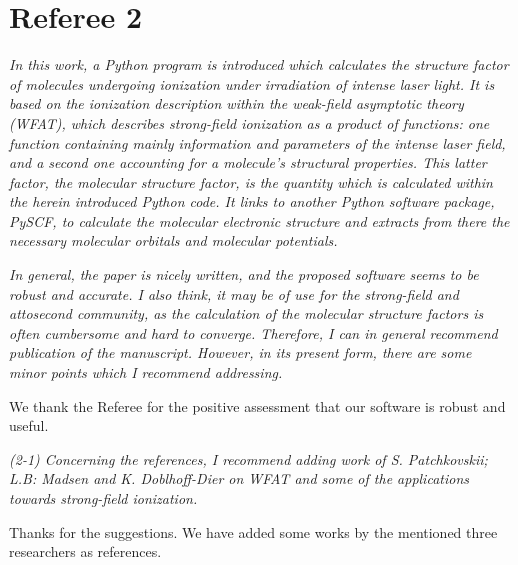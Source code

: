 \documentclass[a4paper,11pt]{article}
\begin{document}
\vspace{2em}



\section*{Referee 2}

\textit{
In this work, a Python program is introduced which calculates the structure factor of molecules undergoing ionization under irradiation of intense laser light. It is based on the ionization description within the weak-field asymptotic theory (WFAT), which describes strong-field ionization as a product of functions: one function containing mainly information and parameters of the intense laser field, and a second one accounting for a molecule's structural properties. This latter factor, the molecular structure factor, is the quantity which is calculated within the herein introduced Python code. It links to another Python software package, PySCF, to calculate the molecular electronic structure and extracts from there the necessary molecular orbitals and molecular potentials.}

\textit{In general, the paper is nicely written, and the proposed software seems to be robust and accurate. I also think, it may be of use for the strong-field and attosecond community, as the calculation of the molecular structure factors is often cumbersome and hard to converge. Therefore, I can in general recommend publication of the manuscript. However, in its present form, there are some minor points which I recommend addressing.
}

\vspace{1em}

We thank the Referee for the positive assessment that our software is robust and useful.

\vspace{2em}


\textit{
(2-1)
Concerning the references, I recommend adding work of S. Patchkovskii; L.B: Madsen and K. Doblhoff-Dier on WFAT and some of the applications towards strong-field ionization.
}

\vspace{1em}

Thanks for the suggestions.
We have added some works by the mentioned three researchers as references.
\end{document}
